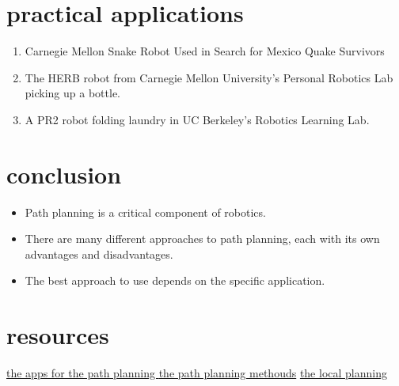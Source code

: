 \documentclass{article}
\begin{document}
\section{practical applications}
\begin{enumerate}
\item Carnegie Mellon Snake Robot Used in Search for Mexico Quake Survivors
\item The HERB robot from Carnegie Mellon University's Personal Robotics Lab picking up a bottle.
\item A PR2 robot folding laundry in UC Berkeley's Robotics Learning Lab. 
\end{enumerate}
\section{conclusion}
\begin{itemize}
\item Path planning is a critical component of robotics.
\item There are many different approaches to path planning, each with its own advantages and disadvantages.
\item The best approach to use depends on the specific application.
\end{itemize}
\section{resources}
 \href{https://www.researchgate.net/figure/Real-world-applications-of-motion-planning-a-An-urban-search-and-rescue-robot-from_fig3_260691259}{the apps for the path planning }
 \href{https://www.mdpi.com/2504-446X/7/2/145#:~:text=At%20present%2C%20there%20are%20various,)%2Dbased%20algorithms%20%5B22%5D.}{the path planning methouds}
  \href{https://onlinelibrary.wiley.com/doi/full/10.1002/rob.22055}{the local planning}
\end{document}
